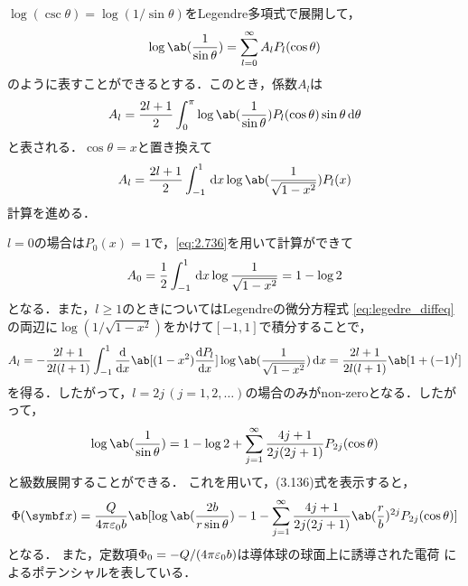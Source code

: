   $\log(\csc\theta) = \log(1/\sin\theta)$をLegendre多項式で展開して，
  \begin{gather}%
    \log\ab(\frac{1}{\sin\theta}) = \sum_{l=0}^\infty A_l P_l(\cos\theta)
  \end{gather}%
   のように表すことができるとする．このとき，係数$A_l$は
   \begin{gather}%
     A_l = \frac{2l+1}{2} \int_0^\pi \log\ab(\frac{1}{\sin\theta}) P_l(\cos\theta) \sin\theta \dl{\theta}
   \end{gather}%
   と表される．$\cos\theta = x$と置き換えて
   \begin{gather}%
     A_l = \frac{2l+1}{2} \int_{-1}^{1} \dl{x} \log\ab(\frac{1}{\sqrt{1-x^2}}) P_l(x)
   \end{gather}%
   計算を進める．

   $l = 0$の場合は$P_0(x) = 1$で，\eqref{eq:2.736}を用いて計算ができて
   \begin{gather}%
     A_0 = \frac{1}{2} \int_{-1}^1 \dl{x} \log\frac{1}{\sqrt{1-x^2}}  = 1 - \log 2
   \end{gather}%
   となる．また，$l \geq 1$のときについてはLegendreの微分方程式
   \eqref{eq:legedre_diffeq}の両辺に$\log(1/\sqrt{1-x^2})$をかけて$[-1,1]$で積分することで，
   \begin{gather}%
     A_l = -\frac{2l+1}{2l(l+1)} \int_{-1}^1 \diff**{x}{\ab[(1-x^2)\diff{P_l}{x}]} \log\ab(\frac{1}{\sqrt{1-x^2}}) \dl{x} = \frac{2l+1}{2l(l+1)}\ab[1 + (-1)^l]
   \end{gather}%
   を得る．したがって，$l=2j\,(j=1, 2, \ldots)$の場合のみがnon-zeroとなる．したがって，
   \begin{gather}%
     \log\ab(\frac{1}{\sin\theta}) = 1 - \log 2 + \sum_{j=1}^\infty \frac{4j+1}{2j(2j+1)} P_{2j}(\cos\theta)
   \end{gather}%
   と級数展開することができる．
   これを用いて，(3.136)式を表示すると，
   \begin{gather}%
     \Phi(\bs{x}) = \frac{Q}{4\pi\eps_0 b}\ab[\log\ab(\frac{2b}{r\sin\theta}) - 1 - \sum_{j =1}^\infty \frac{4j+1}{2j(2j+1)}\ab(\frac rb)^{2j} P_{2j}(\cos\theta)]
   \end{gather}%
   となる．
   また，定数項$\Phi_0 = -Q/(4\pi \varepsilon_0 b)$は導体球の球面上に誘導された電荷
   によるポテンシャルを表している．


